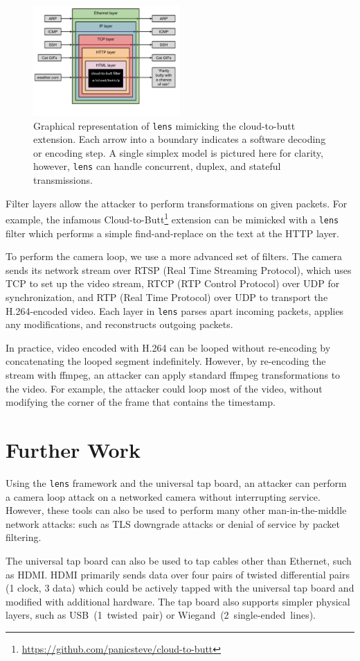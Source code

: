 \documentclass[12pt,notitlepage]{article}
\begin{document}
\begin{figure}[h]
    \centering
    \includegraphics[width=0.5\textwidth]{lens_c2b}
    \caption{Graphical representation of \texttt{lens} mimicking the cloud-to-butt extension. Each arrow into a boundary indicates a software decoding or encoding step. A single simplex model is pictured here for clarity, however, \texttt{lens} can handle concurrent, duplex, and stateful transmissions.}
\end{figure}

Filter layers allow the attacker to perform transformations on given packets. For example, the infamous Cloud-to-Butt\footnote{\url{https://github.com/panicsteve/cloud-to-butt}} extension can be mimicked with a \texttt{lens} filter which performs a simple find-and-replace on the text at the HTTP layer.

To perform the camera loop, we use a more advanced set of filters. The camera sends its network stream over RTSP (Real Time Streaming Protocol), which uses TCP to set up the video stream, RTCP (RTP Control Protocol) over UDP for synchronization, and RTP (Real Time Protocol) over UDP to transport the H.264-encoded video. Each layer in \texttt{lens} parses apart incoming packets, applies any modifications, and reconstructs outgoing packets.

	In practice, video encoded with H.264 can be looped without re-encoding by concatenating the looped segment indefinitely. However, by re-encoding the stream with ffmpeg, an attacker can apply standard ffmpeg transformations to the video. For example, the attacker could loop most of the video, without modifying the corner of the frame that contains the timestamp.


\section{Further Work}
Using the \texttt{lens} framework and the universal tap board, an attacker can perform a camera loop attack on a networked camera without interrupting service. However, these tools can also be used to perform many other man-in-the-middle network attacks: such as TLS downgrade attacks or denial of service by packet filtering. 

	The universal tap board can also be used to tap cables other than Ethernet, such as HDMI. HDMI primarily sends data over four pairs of twisted differential pairs (1 clock, 3 data) which could be actively tapped with the universal tap board and modified with additional hardware. The tap board also supports simpler physical layers, such as USB~(1~twisted~pair) or Wiegand~(2~single-ended~lines). 
\end{document}
